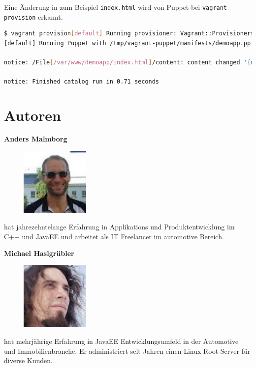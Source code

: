 \documentclass[12pt,a4paper,ngerman]{article}
\begin{document}
Eine Änderung in zum Beispiel \lstinline$index.html$ wird von Puppet bei \lstinline$vagrant provision$ erkannt.
\begin{lstlisting}[language=sh,caption=Puppet Provisioning nach Änderung von index.html, label=provisionapp]
$ vagrant provision[default] Running provisioner: Vagrant::Provisioners::Puppet...
[default] Running Puppet with /tmp/vagrant-puppet/manifests/demoapp.pp...

notice: /File[/var/www/demoapp/index.html]/content: content changed '{md5}90a8d419b9c7b43b09ba73abebaf8f4c' to '{md5}0a4ee5bb63c3e5c29cc54cf36a4be23c'

notice: Finished catalog run in 0.71 seconds
\end{lstlisting}


\section*{Autoren}

\newcommand{\authorboxheight}{5cm}
\begin{minipage}[t][\authorboxheight]{0.45\textwidth}
\textbf{Anders Malmborg}
\vskip0.3cm
\begin{figure}
\vspace{-20pt}
\includegraphics[width=0.3\textwidth]{images/anders.jpg}
\vspace{-20pt}
\end{figure}
hat jahrezehntelange Erfahrung in Applikations und Produktentwicklung im C++ und JavaEE  und arbeitet als IT Freelancer im automotive Bereich. 
\end{minipage}
\hspace{0.1\textwidth}
\begin{minipage}[t][\authorboxheight]{0.45\textwidth}
\textbf{Michael Haslgrübler}
\vskip0.3cm
\begin{figure}
\vspace{-20pt}
\includegraphics[width=0.3\textwidth]{images/michael.jpg}
\vspace{-20pt}
\end{figure}
hat mehrjährige Erfahrung in JavaEE Entwicklungsumfeld in der Automotive und Immobilienbranche. Er administriert seit Jahren einen Linux-Root-Server für diverse Kunden.
\end{minipage}



\end{document}
